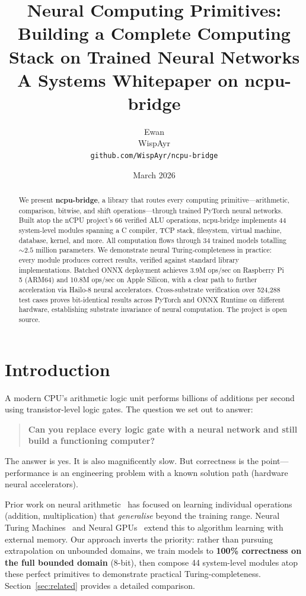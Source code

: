 \documentclass[11pt,a4paper]{article}
\title{
    \vspace{-1cm}
    \textbf{Neural Computing Primitives: Building a Complete Computing Stack on Trained Neural Networks}\\[0.5em]
    \large A Systems Whitepaper on ncpu-bridge
}
\author{
    Ewan\\
    WispAyr\\
    \texttt{github.com/WispAyr/ncpu-bridge}
}
\date{March 2026}
\begin{document}
\maketitle

\begin{abstract}
We present \textbf{ncpu-bridge}, a library that routes every computing primitive---arithmetic, comparison, bitwise, and shift operations---through trained PyTorch neural networks. Built atop the nCPU project's 66 verified ALU operations, ncpu-bridge implements 44 system-level modules spanning a C compiler, TCP stack, filesystem, virtual machine, database, kernel, and more. All computation flows through 34 trained models totalling ${\sim}2.5$ million parameters. We demonstrate neural Turing-completeness in practice: every module produces correct results, verified against standard library implementations. Batched ONNX deployment achieves 3.9M ops/sec on Raspberry Pi 5 (ARM64) and 10.8M ops/sec on Apple Silicon, with a clear path to further acceleration via Hailo-8 neural accelerators. Cross-substrate verification over 524,288 test cases proves bit-identical results across PyTorch and ONNX Runtime on different hardware, establishing substrate invariance of neural computation. The project is open source.
\end{abstract}

\section{Introduction}

A modern CPU's arithmetic logic unit performs billions of additions per second using transistor-level logic gates. The question we set out to answer:

\begin{quote}
\textbf{Can you replace every logic gate with a neural network and still build a functioning computer?}
\end{quote}

The answer is yes. It is also magnificently slow. But correctness is the point---performance is an engineering problem with a known solution path (hardware neural accelerators).

Prior work on neural arithmetic~\cite{trask2018nalu, madsen2020nau, schlor2020inalu, mistry2022primer} has focused on learning individual operations (addition, multiplication) that \emph{generalise} beyond the training range. Neural Turing Machines~\cite{graves2014ntm} and Neural GPUs~\cite{kaiser2015neuralgpu} extend this to algorithm learning with external memory. Our approach inverts the priority: rather than pursuing extrapolation on unbounded domains, we train models to \textbf{100\% correctness on the full bounded domain} (8-bit), then compose 44 system-level modules atop these perfect primitives to demonstrate practical Turing-completeness. Section~\ref{sec:related} provides a detailed comparison.
\end{document}
